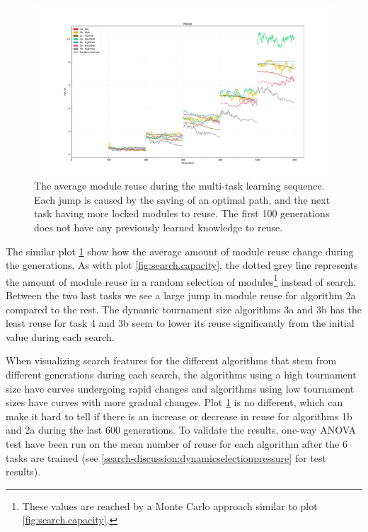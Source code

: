 \begin{figure}[p!]%
    \includegraphics[width=1.2\textwidth,center]{Chapters/Experiments/search_algo/figures/Module_reuse_pr_generation.pdf}
    \caption{The average module reuse during the multi-task learning sequence. Each jump is caused by the saving of an optimal path, and the next task having more locked modules to reuse. The first 100 generations does not have any previously learned knowledge to reuse.}
    \label{fig:search.reuse}
\end{figure}

The similar plot \ref{fig:search.reuse} show how the average amount of module reuse change during the generations. As with plot \ref{fig:search.capacity}, the dotted grey line represents the amount of module reuse in a random selection of modules\footnote{These values are reached by a Monte Carlo approach similar to plot \ref{fig:search.capacity}.} instead of search. Between the two last tasks we see a large jump in module reuse for algorithm 2a compared to the rest. The dynamic tournament size algorithms 3a and 3b has the least reuse for task 4 and 3b seem to lower its reuse significantly from the initial value during each search. 

When visualizing search features for the different algorithms that stem from different generations during each search, the algorithms using a high tournament size have curves undergoing rapid changes and algorithms using low tournament sizes have curves with more gradual changes. Plot \ref{fig:search.reuse} is no different, which can make it hard to tell if there is an increase or decrease in reuse for algorithms 1b and 2a during the last 600 generations. To validate the results, one-way ANOVA test have been run on the mean number of reuse for each algorithm after the 6 tasks are trained (see \ref{search-discussion:dynamicselectionpressure} for test results).

